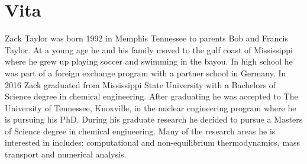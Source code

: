 \chapter*{Vita} \label{ch:vita}
Zack Taylor was born 1992 in Memphis Tennessee to parents Bob and Francis Taylor. At a young age he and his family moved to the gulf coast of Mississippi where he grew up playing soccer and swimming in the bayou. In high school he was part of a foreign exchange program with a partner school in Germany. In 2016 Zack graduated from Mississippi State University with a Bachelors of Science degree in chemical engineering. After graduating he was accepted to The University of Tennessee, Knoxville, in the nuclear engineering program where he is pursuing his PhD. During his graduate research he decided to pursue a Masters of Science degree in chemical engineering. Many of the research areas he is interested in includes; computational and non-equilibrium thermodynamics, mass transport and numerical analysis. 